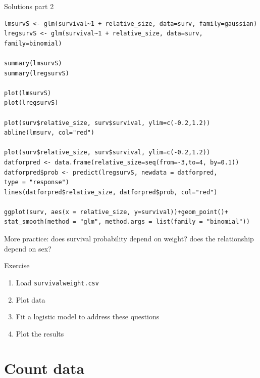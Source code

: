 \documentclass[10pt]{beamer}
\makeatletter
\newenvironment{kframe}{%
 \def\at@end@of@kframe{}%
 \ifinner\ifhmode%
  \def\at@end@of@kframe{\end{minipage}}%
  \begin{minipage}{\columnwidth}%
 \fi\fi%
 \def\FrameCommand##1{\hskip\@totalleftmargin \hskip-\fboxsep
 \colorbox{shadecolor}{##1}\hskip-\fboxsep
     \hskip-\linewidth \hskip-\@totalleftmargin \hskip\columnwidth}%
 \MakeFramed {\advance\hsize-\width
   \@totalleftmargin\z@ \linewidth\hsize
   \@setminipage}}%
 {\par\unskip\endMakeFramed%
 \at@end@of@kframe}
\newenvironment{knitrout}{}{} %
\makeatother
\begin{document}
\begin{frame}[fragile]{Solutions part 2}
     
\begin{knitrout}
\color{fgcolor}\begin{kframe}
\footnotesize
\begin{verbatim}
lmsurvS <- glm(survival~1 + relative_size, data=surv, family=gaussian)
lregsurvS <- glm(survival~1 + relative_size, data=surv, family=binomial)

summary(lmsurvS)
summary(lregsurvS)

plot(lmsurvS)
plot(lregsurvS)

plot(surv$relative_size, surv$survival, ylim=c(-0.2,1.2))
abline(lmsurv, col="red")

plot(surv$relative_size, surv$survival, ylim=c(-0.2,1.2))
datforpred <- data.frame(relative_size=seq(from=-3,to=4, by=0.1))
datforpred$prob <- predict(lregsurvS, newdata = datforpred,
type = "response")
lines(datforpred$relative_size, datforpred$prob, col="red")

ggplot(surv, aes(x = relative_size, y=survival))+geom_point()+
stat_smooth(method = "glm", method.args = list(family = "binomial"))

\end{verbatim}
\end{kframe}
\end{knitrout}
\end{frame}


\begin{frame}{More practice: does survival probability depend on weight? does the relationship depend on sex?}
 
  \begin{exampleblock}{Exercise}
    \begin{enumerate}
      \item Load \texttt{survivalweight.csv}
      \item Plot data
      \item Fit a logistic model to address these questions
      \item Plot the results
    \end{enumerate}
  \end{exampleblock}
 \end{frame}


\section{Count data}
\end{document}
